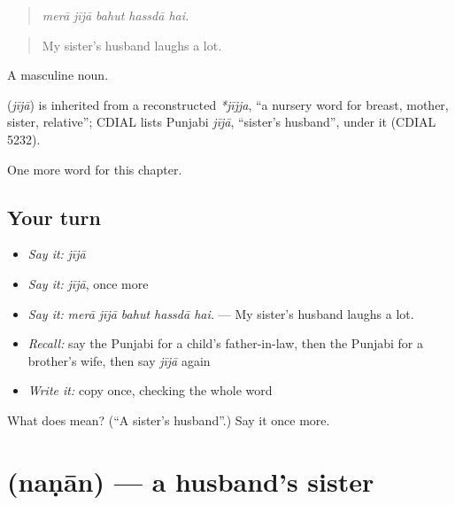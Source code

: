 \begin{quote}
    
\end{quote}

\begin{quote}
\emph{merā jījā bahut hassdā hai.}
\end{quote}

\begin{quote}
My sister's husband laughs a lot.
\end{quote}

A masculine noun.

\begin{cousinweb}
\textbf{} (\emph{jījā}) is inherited from a reconstructed \emph{*jījja}, \textquotedblleft{}a nursery word for breast, mother, sister, relative\textquotedblright{}; CDIAL lists Punjabi \emph{jījā}, \textquotedblleft{}sister's husband\textquotedblright{}, under it (CDIAL 5232).
\end{cousinweb}

\begin{grammarlens}[title={What you've built}]
One more word for this chapter.
\end{grammarlens}

\subsection*{Your turn}
\begin{itemize}
\raggedright
  \item \emph{Say it:} \emph{jījā}
  \item \emph{Say it:} \emph{jījā}, once more
  \item \emph{Say it:} \emph{merā jījā bahut hassdā hai.} — My sister's husband laughs a lot.
  \item \emph{Recall:} say the Punjabi for a child's father-in-law, then the Punjabi for a brother's wife, then say \emph{jījā} again
  \item \emph{Write it:} copy \textbf{} once, checking the whole word
\end{itemize}

\begin{tcolorbox}[breakable,colback=teal!4,colframe=teal!35!black,title={Before you move on}]
What does  mean? (\textquotedblleft{}A sister's husband\textquotedblright{}.) Say it once more.
\end{tcolorbox}
\section[\texorpdfstring{\pa{ਨਣਾਨ} (naṇān)}{ਨਣਾਨ (naṇān)}]{ (naṇān) — a husband's sister}


